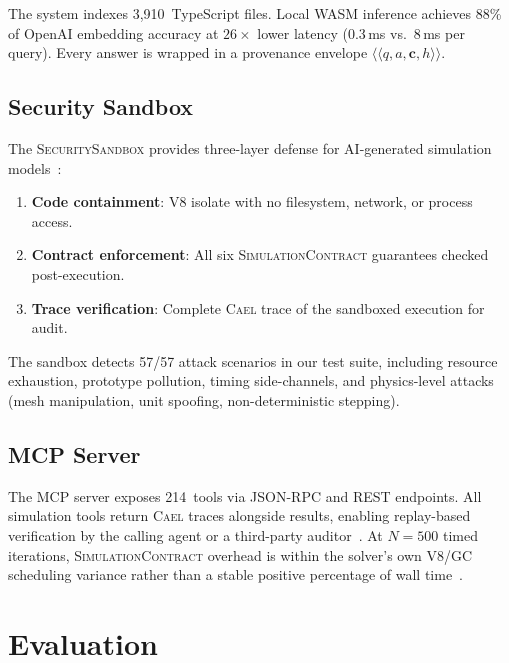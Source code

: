 \documentclass[sigchi-a]{acmart}
\newcommand{\cael}{\textsc{Cael}}
\newcommand{\simcontract}{\textsc{SimulationContract}}
\newcommand{\sandbox}{\textsc{SecuritySandbox}} %
\newcommand{\prov}[1]{\langle\!\langle #1 \rangle\!\rangle}
\begin{document}
The system indexes 3,910~TypeScript files. Local WASM inference achieves
88\% of OpenAI embedding accuracy at $26\times$ lower latency (0.3\,ms vs.\
8\,ms per query). Every answer is wrapped in a provenance envelope
$\prov{q, a, \mathbf{c}, h}$.

\subsection{Security Sandbox}

The \sandbox{} provides three-layer defense for AI-generated simulation
models~\cite{sandbox-paper}:

\begin{enumerate}
  \item \textbf{Code containment}: V8 isolate with no filesystem, network,
    or process access.
  \item \textbf{Contract enforcement}: All six \simcontract{} guarantees
    checked post-execution.
  \item \textbf{Trace verification}: Complete \cael{} trace of the sandboxed
    execution for audit.
\end{enumerate}

The sandbox detects 57/57 attack scenarios in our test suite, including
resource exhaustion, prototype pollution, timing side-channels, and
physics-level attacks (mesh manipulation, unit spoofing, non-deterministic
stepping).

\subsection{MCP Server}

The MCP server exposes 214~tools via JSON-RPC and REST endpoints. All
simulation tools return \cael{} traces alongside results, enabling
replay-based verification by the calling agent or a third-party
auditor~\cite{mcp-trust-paper}. At $N{=}500$ timed iterations, \simcontract{}
overhead is within the solver's own V8/GC scheduling variance rather than a
stable positive percentage of wall time~\cite{mcp-trust-paper}.


\section{Evaluation}
\label{sec:evaluation}
\end{document}

